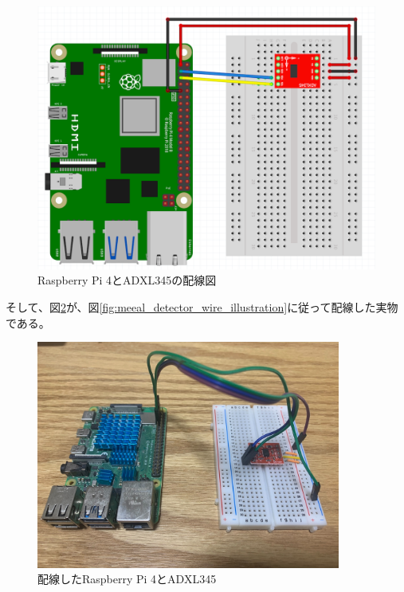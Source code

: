 \begin{figure}[htbp]
  \caption{Raspberry Pi 4とADXL345の配線図}
  \label{fig:meal_detector_wire_illustration}
  \begin{center}
    \includegraphics[bb=0 0 1000 800,width=15cm]{assets/raspi_adxl345.png}
  \end{center}
\end{figure}

そして、図\ref{fig:meal_detector}が、図\ref{fig:meeal_detector_wire_illustration}に従って配線した実物である。

\begin{figure}[htbp]
  \caption{配線したRaspberry Pi 4とADXL345}
  \label{fig:meal_detector}
  \begin{center}
    \includegraphics[bb=0 0 1300 1100,width=10cm]{assets/meal_detector.jpg}
  \end{center}
\end{figure}

